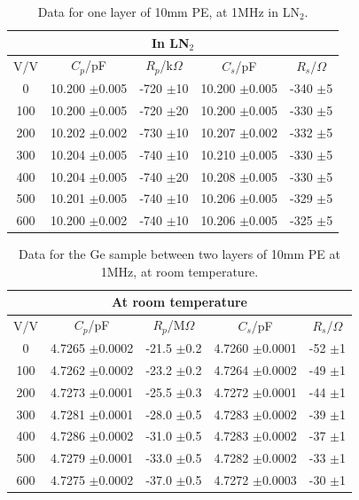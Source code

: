 \documentclass[a4paper,11pt]{article}
\begin{document}
\begin{table}[htbp]
\label{t:polyLN2}
\begin{center}
	\caption{Data for one layer of 10mm PE, at 1MHz in LN$_{2}$.}
\begin{tabular}{| c | c | c | c | c |}
	\hline
	\multicolumn{5}{|c|}{In LN$_{2}$}\\
	\hline
		V/V & $C_{p}$/pF & $R_{p}$/k$\Omega$ & $C_{s}$/pF & $R_{s}$/$\Omega$\\ \hline
		
		0 & 10.200 $\pm$0.005 & -720 $\pm$10 & 10.200 $\pm$0.005 & -340 $\pm$5\\ \hline
		100 & 10.200 $\pm$0.005 & -720 $\pm$20 & 10.200 $\pm$0.005 & -330 $\pm$5\\ \hline
		200 & 10.202 $\pm$0.002 & -730 $\pm$10 & 10.207 $\pm$0.002 & -332 $\pm$5\\ \hline
		300 & 10.204 $\pm$0.005 & -740 $\pm$10 & 10.210 $\pm$0.005 & -330 $\pm$5\\ \hline
		400 & 10.204 $\pm$0.005 & -740 $\pm$20 & 10.208 $\pm$0.005 & -330 $\pm$5\\ \hline
		500 & 10.201 $\pm$0.005 & -740 $\pm$10 & 10.206 $\pm$0.005 & -329 $\pm$5\\ \hline
		600 & 10.200 $\pm$0.002 & -740 $\pm$10 & 10.206 $\pm$0.005 & -325 $\pm$5 \\
	\hline
\end{tabular}
\end{center}	
\end{table}


\begin{table}[htbp]
\label{t:polyGeRT}
\begin{center}
	\caption{Data for the Ge sample between two layers of 10mm PE at 1MHz, at room temperature.}
\begin{tabular}{| c | c | c | c | c |}
	\hline
	\multicolumn{5}{|c|}{At room temperature}\\
	\hline
		V/V & $C_{p}$/pF & $R_{p}$/M$\Omega$ & $C_{s}$/pF & $R_{s}$/$\Omega$\\ \hline
		
		0 & 4.7265 $\pm$0.0002 & -21.5 $\pm$0.2 & 4.7260 $\pm$0.0001 & -52 $\pm$1\\ \hline
		100 & 4.7262 $\pm$0.0002 & -23.2 $\pm$0.2 & 4.7264 $\pm$0.0002 & -49 $\pm$1\\ \hline
		200 & 4.7273 $\pm$0.0001 & -25.5 $\pm$0.3 & 4.7272 $\pm$0.0001 & -44 $\pm$1\\ \hline
		300 & 4.7281 $\pm$0.0001 & -28.0 $\pm$0.5 & 4.7283 $\pm$0.0002 & -39 $\pm$1\\ \hline
		400 & 4.7286 $\pm$0.0002 & -31.0 $\pm$0.5 & 4.7283 $\pm$0.0002 & -37 $\pm$1\\ \hline
		500 & 4.7279 $\pm$0.0001 & -33.0 $\pm$0.5 & 4.7282 $\pm$0.0002 & -33 $\pm$1\\ \hline
		600 & 4.7275 $\pm$0.0002 & -37.0 $\pm$0.5 & 4.7272 $\pm$0.0003 & -30 $\pm$1 \\
	\hline
\end{tabular}
\end{center}	
\end{table}
\end{document}
